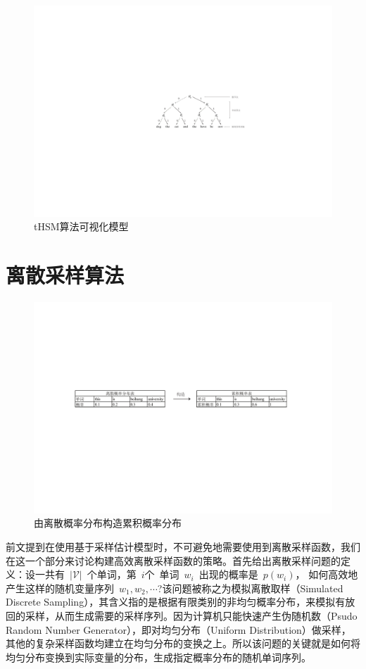 \begin{figure}[!t]
  \centering
\includegraphics[width=.85\linewidth]{./figures/thsm-example.pdf}
\caption{tHSM算法可视化模型}\label{fig:case_thsm}
\end{figure}

\section{离散采样算法}
\begin{figure}[!b]
  \centering
\includegraphics[width=1\linewidth]{./figures/cdfreverse.pdf}
\caption{由离散概率分布构造累积概率分布}\label{fig:cdf_reverse}
\end{figure}

前文提到在使用基于采样估计模型时，不可避免地需要使用到离散采样函数，我们在这一个部分来讨论构建高效离散采样函数的策略。首先给出离散采样问题的定义：设一共有~$|\mathcal{V}|$~个单词，第~$i$个~单词~$w_i$~出现的概率是~$p(w_i)$， 如何高效地产生这样的随机变量序列~$w_1,w_2,\cdots$?该问题被称之为模拟离散取样（Simulated Discrete Sampling），其含义指的是根据有限类别的非均匀概率分布，来模拟有放回的采样，从而生成需要的采样序列。因为计算机只能快速产生伪随机数（Psudo Random Number Generator），即对均匀分布（Uniform Distribution）做采样，其他的复杂采样函数均建立在均匀分布的变换之上。所以该问题的关键就是如何将均匀分布变换到实际变量的分布，生成指定概率分布的随机单词序列。

